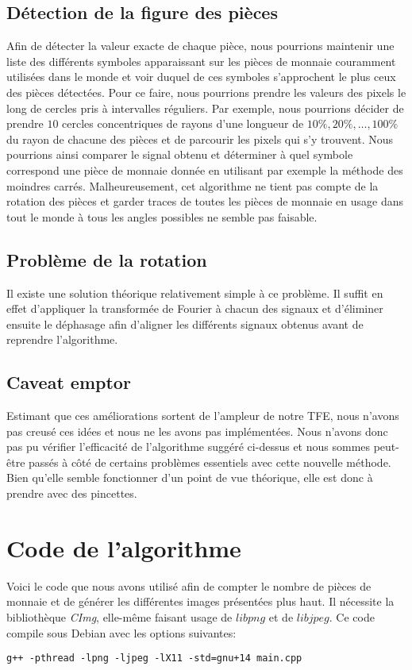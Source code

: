 \documentclass[12pt,titlepage]{article}
\begin{document}
\subsection{Détection de la figure des pièces}
Afin de détecter la valeur exacte de chaque pièce, nous pourrions maintenir une liste des différents symboles apparaissant sur les pièces de monnaie couramment utilisées dans le monde et voir duquel de ces symboles s'approchent le plus ceux des pièces détectées. Pour ce faire, nous pourrions prendre les valeurs des pixels le long de cercles pris à intervalles réguliers. Par exemple, nous pourrions décider de prendre $10$ cercles concentriques de rayons d'une longueur de $10\%, 20\%, \ldots, 100\%$ du rayon de chacune des pièces et de parcourir les pixels qui s'y trouvent. Nous pourrions ainsi comparer le signal obtenu et déterminer à quel symbole correspond une pièce de monnaie donnée en utilisant par exemple la méthode des moindres carrés. Malheureusement, cet algorithme ne tient pas compte de la rotation des pièces et garder traces de toutes les pièces de monnaie en usage dans tout le monde à tous les angles possibles ne semble pas faisable.

\subsection{Problème de la rotation}
Il existe une solution théorique relativement simple à ce problème. Il suffit en effet d'appliquer la transformée de Fourier à chacun des signaux et d'éliminer ensuite le déphasage afin d'aligner les différents signaux obtenus avant de reprendre l'algorithme.

\subsection{Caveat emptor}
Estimant que ces améliorations sortent de l'ampleur de notre TFE, nous n'avons pas creusé ces idées et nous ne les avons pas implémentées. Nous n'avons donc pas pu vérifier l'efficacité de l'algorithme suggéré ci-dessus et nous sommes peut-être passés à côté de certains problèmes essentiels avec cette nouvelle méthode. Bien qu'elle semble fonctionner d'un point de vue théorique, elle est donc à prendre avec des pincettes.

\section{Code de l'algorithme}
Voici le code que nous avons utilisé afin de compter le nombre de pièces de monnaie et de générer les différentes images présentées plus haut. Il nécessite la bibliothèque \textit{CImg}, elle-même faisant usage de $\textit{libpng}$ et de $\textit{libjpeg}$. Ce code compile sous Debian avec les options suivantes:
\begin{lstlisting}
g++ -pthread -lpng -ljpeg -lX11 -std=gnu+14 main.cpp
\end{lstlisting}
\end{document}
